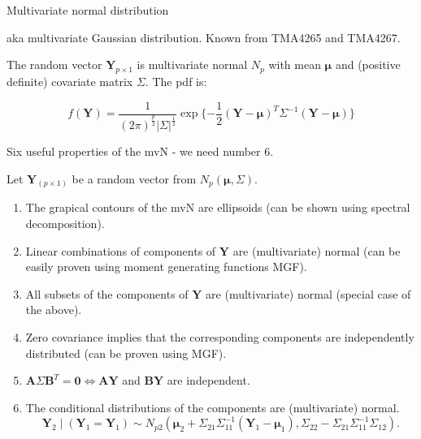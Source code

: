 \documentclass[
  ignorenonframetext,
]{beamer}
\providecommand{\tightlist}{%
  \setlength{\itemsep}{0pt}\setlength{\parskip}{0pt}}
\begin{document}
\begin{frame}

\begin{block}{Multivariate normal distribution}

aka multivariate Gaussian distribution. Known from TMA4265 and TMA4267.

The random vector \(\mathbf{Y}_{p\times 1}\) is multivariate normal
\(N_p\) with mean \(\mathbf{\mu}\) and (positive definite) covariate
matrix \(\Sigma\). The pdf is:

\[f(\mathbf{Y})=\frac{1}{(2\pi)^\frac{p}{2}|\Sigma|^\frac{1}{2}} \exp\{-\frac{1}{2}(\mathbf{Y}-\mathbf{\mu})^T\Sigma^{-1}(\mathbf{Y}-\mathbf{\mu})\}\]

Six useful properties of the mvN - we need number 6.

Let \(\mathbf{Y}_{(p\times 1)}\) be a random vector from
\(N_p(\mathbf{\mu},\Sigma)\).

\begin{enumerate}
\tightlist
\item
  The grapical contours of the mvN are ellipsoids (can be shown using
  spectral decomposition).
\item
  Linear combinations of components of \(\mathbf{Y}\) are (multivariate)
  normal (can be easily proven using moment generating functions MGF).
\item
  All subsets of the components of \(\mathbf{Y}\) are (multivariate)
  normal (special case of the above).
\item
  Zero covariance implies that the corresponding components are
  independently distributed (can be proven using MGF).
\item
  \(\mathbf{A}\Sigma\mathbf{B}^T=\mathbf{0} \Leftrightarrow \mathbf{A}\mathbf{Y}\)
  and \(\mathbf{B}\mathbf{Y}\) are independent.
\item
  The conditional distributions of the components are (multivariate)
  normal.
  \[\mathbf{Y}_2 \mid (\mathbf{Y}_1=\mathbf{Y}_1) \sim N_{p2}(\mathbf{\mu}_2+               \Sigma_{21}\Sigma_{11}^{-1} (\mathbf{Y}_1-\mathbf{\mu}_1),\Sigma_{22}-\Sigma_{21}\Sigma_{11}^{-1}\Sigma_{12}).\]
\end{enumerate}

\end{block}

\end{frame}
\end{document}
